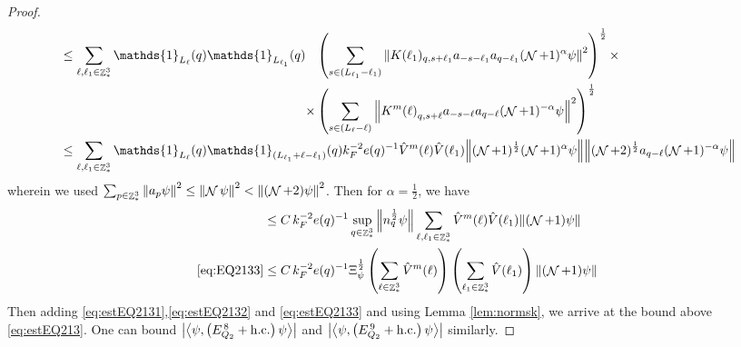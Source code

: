 \documentclass[sn-mathphys, Numbered ,a4paper]{sn-jnl}%
\DeclareMathOperator{\Z}{\mathbb{Z}}
\DeclareMathOperator{\NN}{\mathcal{N}}
\newcommand{\half}{\frac{1}{2}}
\newcommand{\eva}[1]{\left\langle #1 \right\rangle}
\theoremstyle{plain}
\theoremstyle{definition}
\theoremstyle{remark}
\theoremstyle{plain}
\theoremstyle{definition}
\theoremstyle{remark}
\begin{document}
\begin{proof}
\begin{alignat}{2}
		&\leq \sum\limits_{\ell, \ell_1\in \Z^3_*} \mathds{1}_{L_{\ell}}(q) \mathds{1}_{L_{\ell_1}}(q) \begin{aligned}[t]&\left(\sum\limits_{ s \in  (L_{\ell_1}-\ell_1)} \norm{K(\ell_1)_{q,s+\ell_1} a_{-s-\ell_1} a_{q-\ell_1}  (\NN+1)^{\alpha}\psi}^2\right)^\half \times \nonumber\\ \times &\left( \sum\limits_{ s \in (L_{\ell}-\ell) } \norm{ K^m{(\ell)}_{q,s+\ell}  a_{-s-\ell} a_{q-\ell} (\NN+1)^{-\alpha} \psi }^2\right)^\half \end{aligned}\nonumber\\
		&\leq \sum\limits_{\ell, \ell_1\in \Z^3_*} \mathds{1}_{L_{\ell}}(q) \mathds{1}_{(L_{\ell_1}+\ell-\ell_1)}(q)  k_{F}^{-2} e(q)^{-1} \hat{V}^{m}(\ell) \hat{V}(\ell_1) \norm{ (\NN+1)^\half(\NN+1)^{\alpha} \psi} \norm{ (\NN+2)^\half a_{q-\ell} (\NN+1)^{-\alpha} \psi }\nonumber
	\end{alignat} 
	wherein we used $\sum_{p\in \Z^3_*}\norm{a_p \psi}^2\leq\norm{\NN\psi}^2<\norm{(\NN+2)\psi}^2$. Then for $\alpha =  \half $, we have 
	\begin{align}
		&\leq C\,k_{F}^{-2} e(q)^{-1}  \sup\limits_{q\in \Z^3_*}\norm{n_q^\half \psi } \sum\limits_{\ell, \ell_1\in \Z^3_*}  \hat{V}^{m}(\ell) \hat{V}(\ell_1) \norm{ (\NN+1) \psi} \nonumber\\
		\eqref{eq:EQ2133}&\leq C\, k_{F}^{-2} e(q)^{-1}  \Xi_{\psi}^\half \left(\sum\limits_{\ell\in \Z^3_*} \hat{V}^{m}(\ell) \right)\left(  \sum\limits_{ \ell_1\in \Z^3_*} \hat{V}(\ell_1)  \right) \norm{ (\NN+1) \psi}\label{eq:estEQ2133} 
	\end{align}
	Then adding \eqref{eq:estEQ2131},\eqref{eq:estEQ2132} and \eqref{eq:estEQ2133} and using Lemma \ref{lem:normsk}, we arrive at the bound above \eqref{eq:estEQ213}. One can bound $\abs{\eva{\psi,\left(E^{\,8}_{Q_2}+\mathrm{h.c.}\right) \psi }}$ and $\abs{\eva{\psi,\left(E^{\,9}_{Q_2}+\mathrm{h.c.}\right) \psi }}$ similarly.
\end{proof}
\end{document}
